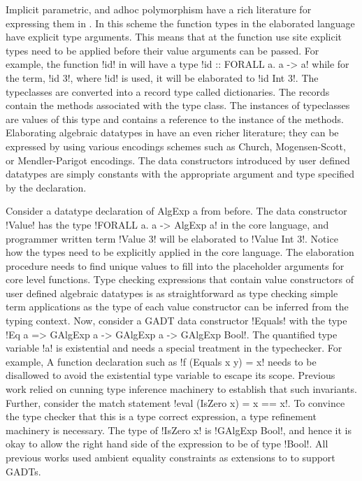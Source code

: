 \documentclass[screen,nonacm]{acmart}
\begin{document}
Implicit parametric\cite{reynolds_user-defined_1978}, and adhoc polymorphism\cite{hall_type_1994} have a rich literature for expressing them in \SF. In this scheme the function types in the elaborated language have explicit type arguments. This means that at the function use site explicit types need to be applied before their value arguments can be passed. For example, the function !id! in \SF will have a type !id :: FORALL a. a -> a! while for the term, !id 3!, where !id! is used, it will be elaborated to !id Int 3!. The typeclasses are converted into a record type called dictionaries. The records contain the methods associated with the type class. The instances of typeclasses are values of this type and contains a reference to the instance of the methods. Elaborating algebraic datatypes in \SF have an even richer literature; they can be expressed by using various encodings schemes such as Church\cite{jansen_efficient_2005,jansen_programming_2013}, Mogensen-Scott\cite{mogensen_efficient_1992}, or Mendler-Parigot encodings\cite{parigot_representation_1990, stump_efficiency_2016}. The data constructors introduced by user defined datatypes are simply constants with the appropriate argument and type specified by the declaration.

Consider a datatype declaration of AlgExp a from before. The data constructor !Value! has the type !FORALL a. a -> AlgExp a! in the core language, and programmer written term !Value 3! will be elaborated to !Value Int 3!. Notice how the types need to be explicitly applied in the core language. The elaboration procedure needs to find unique values to fill into the placeholder arguments for core level functions. Type checking expressions that contain value constructors of user defined algebraic datatypes is as straightforward as type checking simple term applications as the type of each value constructor can be inferred from the typing context. Now, consider a GADT data constructor !Equals! with the type !Eq a => GAlgExp a -> GAlgExp a -> GAlgExp Bool!. The quantified type variable !a! is existential and needs a special treatment in the typechecker. For example, A function declaration such as !f (Equals x y) = x! needs to be disallowed to avoid the existential type variable to escape its scope. Previous work relied on cunning type inference machinery to establish that such invariants. Further, consider the match statement !eval (IsZero x) = x == x!. To convince the type checker that this is a type correct expression, a type refinement machinery is necessary. The type of !IsZero x! is !GAlgExp Bool!, and hence it is okay to allow the right hand side of the expression to be of type !Bool!. All previous works\cite{cheney_first-class_2003, xi_guarded_2003, peyton_jones_simple_2006} used ambient equality constraints as extensions to \SF to support GADTs.
\end{document}
